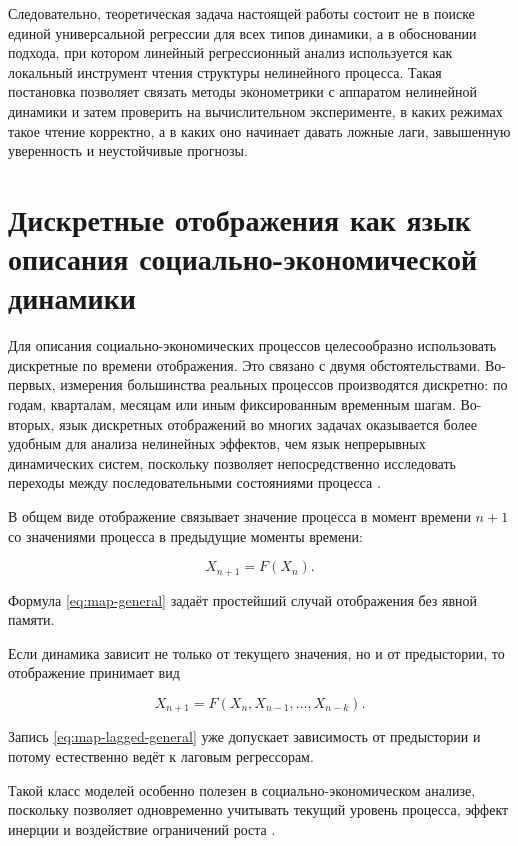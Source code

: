 Следовательно, теоретическая задача настоящей работы состоит не в поиске единой универсальной регрессии для всех типов динамики, а в обосновании подхода, при котором линейный регрессионный анализ используется как локальный инструмент чтения структуры нелинейного процесса. Такая постановка позволяет связать методы эконометрики с аппаратом нелинейной динамики и затем проверить на вычислительном эксперименте, в каких режимах такое чтение корректно, а в каких оно начинает давать ложные лаги, завышенную уверенность и неустойчивые прогнозы.

\section{Дискретные отображения как язык описания социально-экономической динамики}
\label{sec:maps-as-language}

Для описания социально-экономических процессов целесообразно использовать дискретные по времени отображения. Это связано с двумя обстоятельствами. Во-первых, измерения большинства реальных процессов производятся дискретно: по годам, кварталам, месяцам или иным фиксированным временным шагам. Во-вторых, язык дискретных отображений во многих задачах оказывается более удобным для анализа нелинейных эффектов, чем язык непрерывных динамических систем, поскольку позволяет непосредственно исследовать переходы между последовательными состояниями процесса \cite{kuznetsov-maps,kuznetsov-bifurcations,malinetsky}.

В общем виде отображение связывает значение процесса в момент времени \(n+1\) со значениями процесса в предыдущие моменты времени:

\begin{equation}
X_{n+1}=F(X_n).
\label{eq:map-general}
\end{equation}

Формула \eqref{eq:map-general} задаёт простейший случай отображения без явной памяти.

Если динамика зависит не только от текущего значения, но и от предыстории, то отображение принимает вид

\begin{equation}
X_{n+1}=F(X_n,X_{n-1},\ldots,X_{n-k}).
\label{eq:map-lagged-general}
\end{equation}

Запись \eqref{eq:map-lagged-general} уже допускает зависимость от предыстории и потому естественно ведёт к лаговым регрессорам.

Такой класс моделей особенно полезен в социально-экономическом анализе, поскольку позволяет одновременно учитывать текущий уровень процесса, эффект инерции и воздействие ограничений роста \cite{pu,polunin-2019}.

